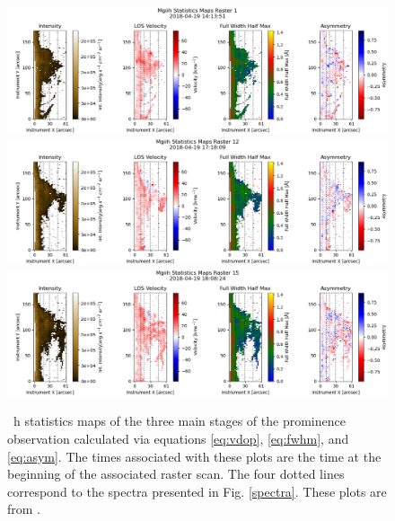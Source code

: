 \begin{figure}
    \includegraphics[width=\linewidth]{./01Observations/figs/20180419/hmaps0.png}
    \includegraphics[width=\linewidth]{./01Observations/figs/20180419/hmaps1.png}
    \includegraphics[width=\linewidth]{./01Observations/figs/20180419/hmaps2.png}
    \caption[\mgii~h statistics maps of the three main stages of the prominence.]{\mgii~h statistics maps of the three main stages of the prominence observation calculated via equations \ref{eq:vdop}, \ref{eq:fwhm}, and \ref{eq:asym}. The times associated with these plots are the time at the beginning of the associated raster scan. The four dotted lines correspond to the spectra presented in Fig. \ref{spectra}. These plots are from \cite{peat_solar_2021}.}
    \label{fig:hmaps}
\end{figure}

